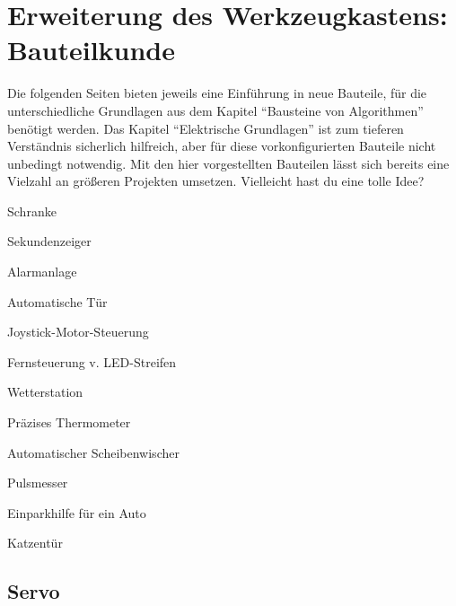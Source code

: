 \pagecolor{CadetBlue!70!green}
\chapter{Erweiterung des Werkzeugkastens: Bauteilkunde}\label{kap:bauteilkunde}

Die folgenden Seiten bieten jeweils eine Einführung in neue Bauteile, für die unterschiedliche Grundlagen aus dem Kapitel \enquote{Bausteine von Algorithmen} benötigt werden. Das Kapitel \enquote{Elektrische Grundlagen} ist zum tieferen Verständnis sicherlich hilfreich, aber für diese vorkonfigurierten Bauteile nicht unbedingt notwendig. Mit den hier vorgestellten Bauteilen lässt sich bereits eine Vielzahl an größeren Projekten umsetzen. Vielleicht hast du eine tolle Idee?

\vspace{3\baselineskip}

\begin{projektueberblick}
	\item Schranke \dotfill \pageref{proj:schranke}
	\item Sekundenzeiger \dotfill \pageref{proj:sekundenzeiger}
	\item Alarmanlage \dotfill \pageref{proj:neigungsalarmanlage}
	\item Automatische Tür \dotfill \pageref{proj:tueroeffner}
	\item Joystick-Motor-Steuerung \dotfill \pageref{proj:joystick-motor}
	\item Fernsteuerung v. LED-Streifen \dotfill \pageref{proj:fernsteuerung-lauflicht}
	\item Wetterstation \dotfill \pageref{proj:wetterstation}
	\item Präzises Thermometer \dotfill \pageref{proj:praezisesthermometer}
	\item Automatischer Scheibenwischer \dotfill \pageref{proj:auto-scheibenwischer}
	\item Pulsmesser \dotfill \pageref{proj:pulsmesser}
	\item Einparkhilfe für ein Auto \dotfill \pageref{proj:einparkhilfe}
	\item Katzentür \dotfill \pageref{proj:katzentuer}
\end{projektueberblick}

\setcounter{aufgabennummer}{0}
\setcounter{projektnummer}{0}

\newpage
\nopagecolor
\section{Servo}
\label{sec:servo}

